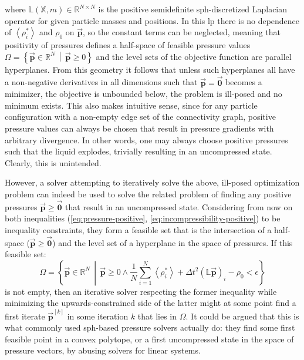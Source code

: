\documentclass[conference]{IEEEtran}
\newcommand\vek[1]{\vec{\bm{#1}}}
\newcommand\mat[1]{{\mathds{#1}}}
\newcommand\br[1]{\left(#1\right)}
\newcommand\abr[1]{\left\langle#1\right\rangle}
\begin{document}
where $\mat{L}(\mat{X},m)\in\mathds{R}^{N\times N}$ is the positive semidefinite \ac{sph}-discretized Laplacian operator for given particle masses and positions. In this \ac{lp} there is no dependence of $\abr{\rho_i^*}$ and $\rho_0$ on $\vek{p}$, so the constant terms can be neglected, meaning that positivity of pressures defines a half-space of feasible pressure values $\Omega = \left\{\vek{p}\in\mathds{R}^N \,\middle|\, \vek{p}\geq 0 \right\}$ and the level sets of the objective function are parallel hyperplanes. From this geometry it follows that unless such hyperplanes all have a non-negative derivatives in all dimensions such that $\vek{p}=\vek{0}$ becomes a minimizer, the objective is unbounded below, the problem is ill-posed and no minimum exists. This also makes intuitive sense, since for any particle configuration with a non-empty edge set of the connectivity graph, positive pressure values can always be chosen that result in pressure gradients with arbitrary divergence. In other words, one may always choose positive pressures such that the liquid explodes, trivially resulting in an uncompressed state. Clearly, this is unintended.


However, a solver attempting to iteratively solve the above, ill-posed optimization problem can indeed be used to solve the related problem of finding any positive pressures $\vek{p}\geq \vek{0}$ that result in an uncompressed state. Considering from now on both inequalities (\autoref{eq:pressure-positive}, \autoref{eq:incompressibility-positive}) to be inequality constraints, they form a feasible set that is the intersection of a half-space ($\vek{p}\geq \vek{0}$) and the level set of a hyperplane in the space of pressures. If this feasible set:
\begin{equation}\label{eq:feasible-pressures}
  \Omega = \left\{\vek{p}\in\mathds{R}^N \,\middle|\, \vek{p}\geq 0 \land \frac{1}{N}\sum_{i=1}^{N}
  \abr{\rho_i^*} + \Delta t^2 \br{\mat{L}\vek{p}}_i -\rho_0 < \epsilon \right\}
\end{equation} 
is not empty, then an iterative solver respecting the former inequality while minimizing the upwards-constrained side of the latter might at some point find a first iterate $\vek{p}^{[k]}$ in some iteration $k$ that lies in $\Omega$. It could be argued that this is what commonly used \ac{sph}-based pressure solvers actually do: they find some first feasible point in a convex polytope, or a first uncompressed state in the space of pressure vectors, by abusing solvers for linear systems. 
\end{document}
